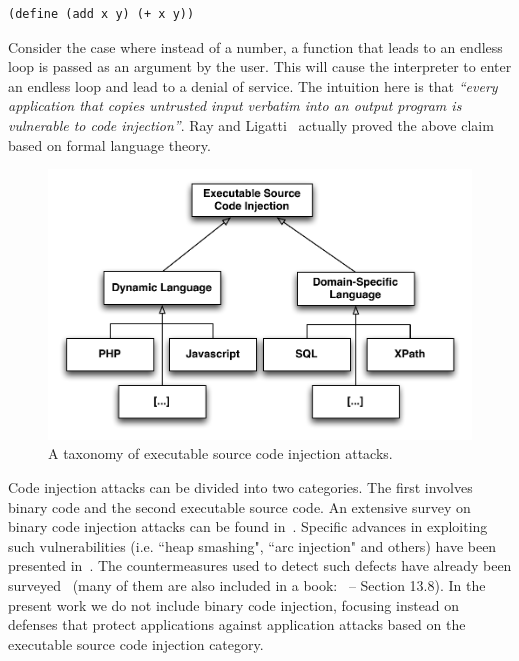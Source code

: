 \documentclass[conference]{IEEEtran}
\begin{document}
\begin{verbatim}
(define (add x y) (+ x y))
\end{verbatim}

\noindent
Consider the case where instead of a number, a function that leads to an
endless loop is passed as an argument by the user. This will cause
the interpreter to enter
an endless loop and lead to a denial of service.
The intuition here is that {\it ``every application that copies
untrusted input verbatim into an output
program is vulnerable to code injection''}.
Ray and Ligatti~\cite{RL12b} actually proved the above
claim based on formal language theory.

\begin{figure}
\begin{center}
\leavevmode
\includegraphics[scale=0.47]{attack-tree-uml.pdf}
\end{center}
\caption{\label{fig:taxonomy}A taxonomy of executable source
code injection attacks.}
\end{figure}

Code injection attacks can be divided into two categories. The first
involves binary code and the second executable source code. An
extensive survey on binary code injection attacks can be found
in~\cite{LC03}. Specific advances in exploiting such vulnerabilities
(i.e. ``heap smashing", ``arc injection" and others) have been
presented in~\cite{PB04}. The countermeasures used to detect such
defects have already been surveyed~\cite{YJP12} (many of them are also
included in a book:~\cite{DKZ12} -- Section 13.8). In the present work
we do not include binary code injection, focusing instead on defenses
that protect applications against application attacks based on the
executable source code injection category.
\end{document}
